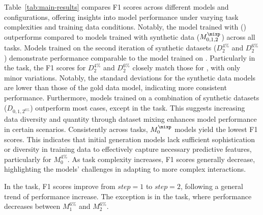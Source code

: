 Table~\ref{tab:main-results} compares F1 scores across different models and configurations, offering insights into model performance under varying task complexities and training data conditions. Notably, the model trained with \dgover (\mgover) outperforms compared to models trained with synthetic data ($M_{0,1,2}^{\mixp}$) across all tasks. Models trained on the second iteration of synthetic datasets ($D_{2}^{4\%}$ and $D_{2}^{6\%}$) demonstrate performance comparable to the model trained on \dgover. Particularly in the  task, the F1 scores for $D_{2}^{4\%}$ and $D_{2}^{6\%}$ closely match those for \dgover, with only minor variations. Notably, the standard deviations for the synthetic data models are lower than those of the gold data model, indicating more consistent performance. Furthermore, models trained on a combination of synthetic datasets ($D_{{0,1,2}^{6\%}}$) outperform most cases, except in the  task. This suggests increasing data diversity and quantity through dataset mixing enhances model performance in certain scenarios.
Consistently across  tasks, $M_{0}^{\mixp}$ models yield the lowest F1 scores. This indicates that initial generation models lack sufficient sophistication or diversity in training data to effectively capture necessary predictive features, particularly for $M_{0}^{4\%}$. As task complexity increases, F1 scores generally decrease, highlighting the models’ challenges in adapting to more complex interactions.

In the  task, F1 scores improve from $step=1$ to $step=2$, following a general trend of performance increase. The exception is in the  task, where performance decreases between $M_{1}^{6\%}$ and $M_{2}^{6\%}$.

